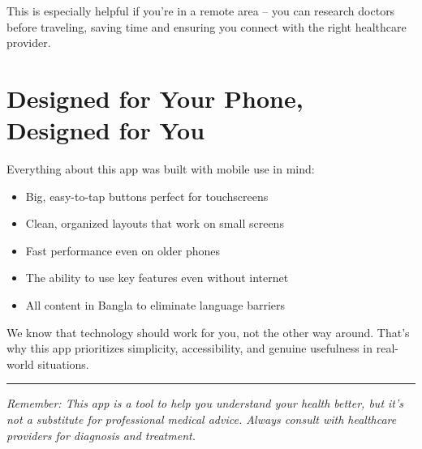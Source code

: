 \documentclass[12pt,a4paper]{article}
\begin{document}
This is especially helpful if you're in a remote area -- you can research doctors before traveling, saving time and ensuring you connect with the right healthcare provider.

\section{Designed for Your Phone, Designed for You}

Everything about this app was built with mobile use in mind:

\begin{itemize}
    \item Big, easy-to-tap buttons perfect for touchscreens
    \item Clean, organized layouts that work on small screens
    \item Fast performance even on older phones
    \item The ability to use key features even without internet
    \item All content in Bangla to eliminate language barriers
\end{itemize}

We know that technology should work for you, not the other way around. That's why this app prioritizes simplicity, accessibility, and genuine usefulness in real-world situations.

\vspace{1cm}
\hrule
\vspace{0.5cm}

\textit{\small Remember: This app is a tool to help you understand your health better, but it's not a substitute for professional medical advice. Always consult with healthcare providers for diagnosis and treatment.}
\end{document}
